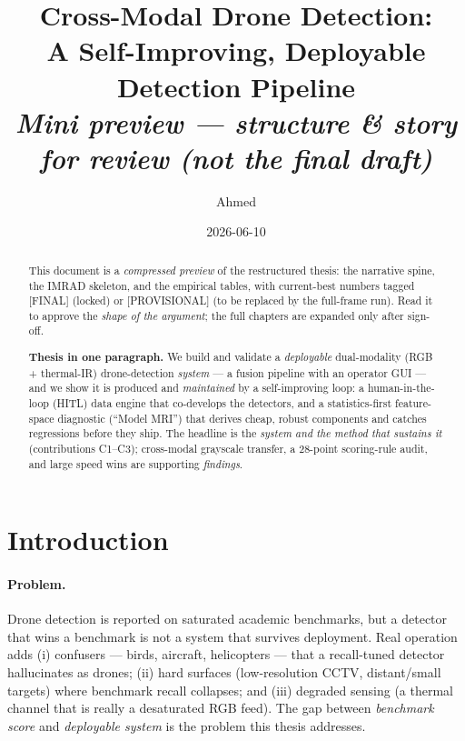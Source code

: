 \documentclass[11pt]{article}
\title{\textbf{Cross-Modal Drone Detection:\\
A Self-Improving, Deployable Detection Pipeline}\\[4pt]
{\large\itshape Mini preview --- structure \& story for review (not the final draft)}}
\author{Ahmed}
\date{2026-06-10}
\newcommand{\final}{{\small\textcolor{green!45!black}{[FINAL]}}}
\newcommand{\prov}{{\small\textcolor{orange!80!black}{[PROVISIONAL]}}}
\begin{document}
\maketitle

\begin{abstract}
\noindent This document is a \emph{compressed preview} of the restructured thesis:
the narrative spine, the IMRAD skeleton, and the empirical tables, with current-best
numbers tagged \final{} (locked) or \prov{} (to be replaced by the full-frame run).
Read it to approve the \emph{shape of the argument}; the full chapters are expanded
only after sign-off.

\medskip
\noindent\textbf{Thesis in one paragraph.} We build and validate a \emph{deployable}
dual-modality (RGB + thermal-IR) drone-detection \emph{system} --- a fusion pipeline with
an operator GUI --- and we show it is produced and \emph{maintained} by a self-improving
loop: a human-in-the-loop (HITL) data engine that co-develops the detectors, and a
statistics-first feature-space diagnostic (``Model MRI'') that derives cheap, robust
components and catches regressions before they ship. The headline is the \emph{system and
the method that sustains it} (contributions C1--C3); cross-modal grayscale transfer, a
28-point scoring-rule audit, and large speed wins are supporting \emph{findings}.
\end{abstract}

\section{Introduction}
\label{sec:intro}

\paragraph{Problem.} Drone detection is reported on saturated academic benchmarks, but a
detector that wins a benchmark is not a system that survives deployment. Real operation adds
(i) confusers --- birds, aircraft, helicopters --- that a recall-tuned detector hallucinates as
drones; (ii) hard surfaces (low-resolution CCTV, distant/small targets) where benchmark recall
collapses; and (iii) degraded sensing (a thermal channel that is really a desaturated RGB feed).
The gap between \emph{benchmark score} and \emph{deployable system} is the problem this thesis
addresses.
\end{document}
